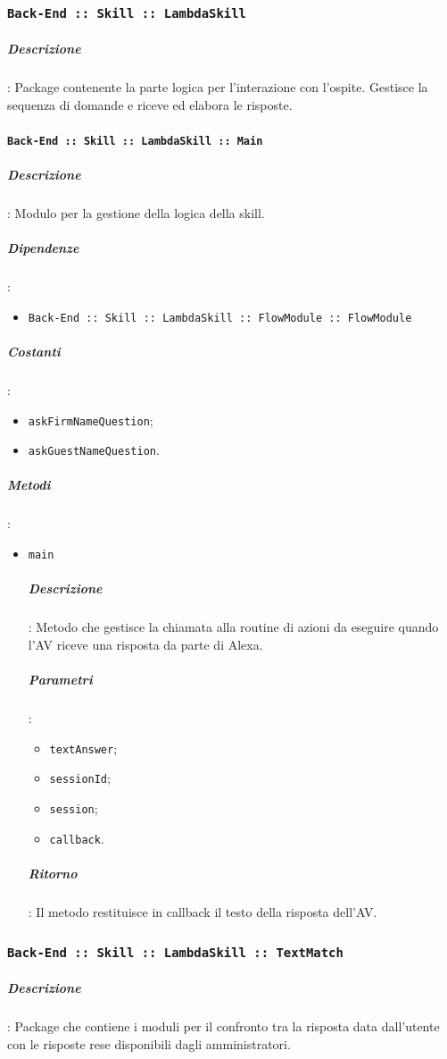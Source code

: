 \documentclass[../DefinizioneDiProdotto_v2.0.0.tex]{subfiles}
\begin{document}
\subsubsection{\texttt{Back-End :: Skill :: LambdaSkill}}
\subparagraph{Descrizione}: Package contenente la parte logica per l'interazione con l'ospite. Gestisce la sequenza di domande e riceve ed elabora le risposte.

\paragraph{\texttt{Back-End :: Skill :: LambdaSkill :: Main}}
\subparagraph{Descrizione}: Modulo per la gestione della logica della skill.
\subparagraph{Dipendenze}:
\begin{itemize}
	\item \texttt{Back-End :: Skill :: LambdaSkill :: FlowModule :: FlowModule}
\end{itemize}
\subparagraph{Costanti}:
\begin{itemize}
	\item \texttt{askFirmNameQuestion};
	\item \texttt{askGuestNameQuestion}.
\end{itemize}
\subparagraph{Metodi}:
\begin{itemize}
	\item \texttt{main}
	      \subparagraph{Descrizione}: Metodo che gestisce la chiamata alla routine di azioni da eseguire quando l'AV riceve una risposta da parte di Alexa.
	      \subparagraph{Parametri}:
	      \begin{itemize}
	      	\item \texttt{textAnswer};
	      	\item \texttt{sessionId};
	      	\item \texttt{session};
	      	\item \texttt{callback}.
	      \end{itemize}
	      \subparagraph{Ritorno}: Il metodo restituisce in callback il testo della risposta dell'AV.
\end{itemize}

\subsubsection{\texttt{Back-End :: Skill :: LambdaSkill :: TextMatch}}
\subparagraph{Descrizione}: Package che contiene i moduli per il confronto tra la risposta data dall'utente con le risposte rese disponibili dagli amministratori.
\end{document}

